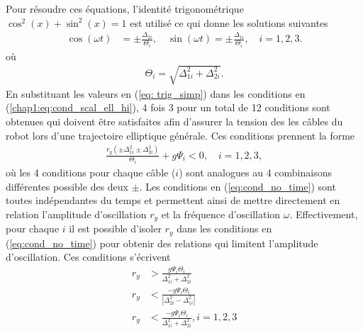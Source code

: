 Pour résoudre ces équations, l'identité trigonométrique $\cos^2(x)+\sin^2(x)=1$ est utilisé ce qui donne les solutions suivantes
\begin{align}
\cos(\omega t) &=\pm \frac{\Delta_{2i}}{\Theta_i},\quad \sin(\omega t) =\pm \frac{\Delta_{1i}}{\Theta_i}, \quad i =1,2,3. \label{eq: trig_simp}
\end{align}
où
\begin{align*}
    \Theta_i = \sqrt{\Delta_{1i}^2+\Delta_{2i}^2 }.
\end{align*}
En substituant les valeurs en (\ref{eq: trig_simp}) dans les conditions en (\ref{chap1:eq:cond_scal_ell_hi}), 4 fois 3 pour un total de 12 conditions sont obtenues qui doivent être satisfaites afin d'assurer la tension des les câbles du robot lors d'une trajectoire elliptique générale. Ces conditions prennent la forme 
\begin{align}
    \frac{r_y\left(\pm \Delta_{1i}^2 \pm \Delta_{2i}^2\right)}{\Theta_i}+g\Psi_i < 0, \quad i =1,2,3, \label{eq:cond_no_time}
\end{align}
où les 4 conditions pour chaque câble ($i$) sont analogues au 4 combinaisons différentes possible des deux $\pm$. Les conditions en (\ref{eq:cond_no_time}) sont toutes indépendantes du temps et permettent ainsi  de mettre directement en relation l'amplitude d'oscillation $r_y$ et la fréquence d'oscillation $\omega$. Effectivement, pour chaque $i$ il est possible d'isoler $r_y$ dans les conditions en (\ref{eq:cond_no_time}) pour obtenir des relations qui limitent l'amplitude d'oscillation. Ces conditions s'écrivent
\begin{align}
    r_y &> \frac{g\Psi_i \Theta_i }{\Delta_{1i}^2 + \Delta_{2i}^2} \label{eq: ineq_ell_1}\\
    r_y &< \frac{-g\Psi_i \Theta_i}{\left|\Delta_{2i}^2 - \Delta_{1i}^2\right|}\label{eq: ineq_ell_23}\\
    r_y &< \frac{-g\Psi_i \Theta_i}{\Delta_{1i}^2 + \Delta_{2i}^2}, i =1,2,3 \label{eq: ineq_ell_4}
\end{align}
